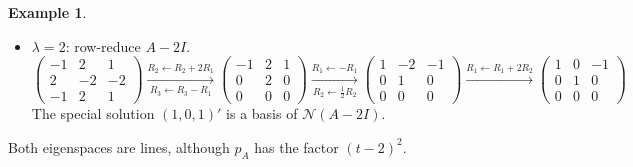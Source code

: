 \documentclass[12pt]{article}
\theoremstyle{definition}
\newtheorem{example}[theorem]{Example}
\begin{document}
\begin{example}
\begin{itemize}
\item \(\lambda=2\): row-reduce \(A-2I\).
\[
\begin{pmatrix}-1&2&1\\2&-2&-2\\-1&2&1\end{pmatrix}
\xrightarrow[R_3\leftarrow R_3-R_1]{R_2\leftarrow R_2+2R_1}
\begin{pmatrix}-1&2&1\\0&2&0\\0&0&0\end{pmatrix}
\xrightarrow[R_2\leftarrow\frac12R_2]{R_1\leftarrow-R_1}
\begin{pmatrix}1&-2&-1\\0&1&0\\0&0&0\end{pmatrix}
\xrightarrow{R_1\leftarrow R_1+2R_2}
\begin{pmatrix}1&0&-1\\0&1&0\\0&0&0\end{pmatrix}
\]
The special solution \((1,0,1)'\) is a basis of \(\mathcal N(A-2I)\).
\end{itemize}
Both eigenspaces are lines, although \(p_A\) has the factor \((t-2)^2\).
\end{example}
\end{document}
